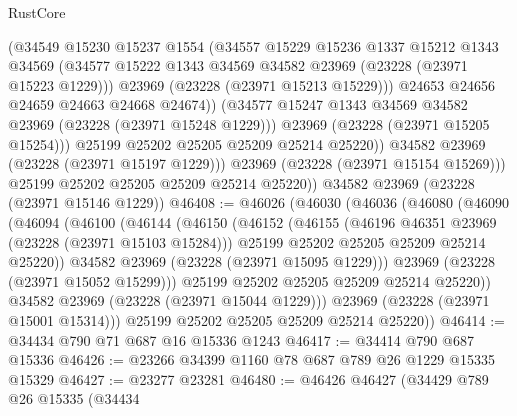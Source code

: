 \begin{lexlean}{RustCore}
\begin{coremodule}
                    (@34549
                      @15230
                      @15237
                      @1554
                      (@34557
                        @15229
                        @15236
                        @1337
                        @15212
                        @1343
                        @34569
                        (@34577 @15222 @1343 @34569 @34582 @23969 (@23228 (@23971 @15223 @1229)))
                        @23969
                        (@23228 (@23971 @15213 @15229)))
                      @24653
                      @24656
                      @24659
                      @24663
                      @24668
                      @24674))
                  (@34577 @15247 @1343 @34569 @34582 @23969 (@23228 (@23971 @15248 @1229)))
                  @23969
                  (@23228 (@23971 @15205 @15254)))
                @25199
                @25202
                @25205
                @25209
                @25214
                @25220))
            @34582
            @23969
            (@23228 (@23971 @15197 @1229)))
          @23969
          (@23228 (@23971 @15154 @15269)))
        @25199
        @25202
        @25205
        @25209
        @25214
        @25220))
    @34582
    @23969
    (@23228 (@23971 @15146 @1229))
@46408 := @46026
    (@46030
      (@46036
        (@46080
          (@46090
            (@46094
              (@46100
                (@46144
                  (@46150
                    (@46152
                      (@46155
                        (@46196 @46351 @23969 (@23228 (@23971 @15103 @15284)))
                        @25199
                        @25202
                        @25205
                        @25209
                        @25214
                        @25220))
                    @34582
                    @23969
                    (@23228 (@23971 @15095 @1229)))
                  @23969
                  (@23228 (@23971 @15052 @15299)))
                @25199
                @25202
                @25205
                @25209
                @25214
                @25220))
            @34582
            @23969
            (@23228 (@23971 @15044 @1229)))
          @23969
          (@23228 (@23971 @15001 @15314)))
        @25199
        @25202
        @25205
        @25209
        @25214
        @25220))
@46414 := @34434 @790 @71 @687 @16 @15336 @1243
@46417 := @34414 @790 @687 @15336
@46426 := @23266 @34399 @1160 @78 @687 @789 @26 @1229 @15335 @15329
@46427 := @23277 @23281
@46480 := @46426
    @46427
    (@34429
      @789
      @26
      @15335
      (@34434

\end{coremodule}
\end{lexlean}
